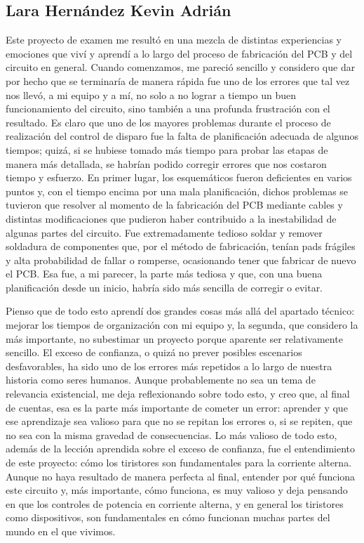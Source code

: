 \documentclass[12pt,a4paper]{article}
\begin{document}
\subsection*{Lara Hernández Kevin Adrián}
Este proyecto de examen me resultó en una mezcla de distintas experiencias y emociones que viví y aprendí a lo largo del proceso de fabricación del PCB y del circuito en general. Cuando comenzamos, me pareció sencillo y considero que dar por hecho que se terminaría de manera rápida fue uno de los errores que tal vez nos llevó, a mi equipo y a mí, no solo a no lograr a tiempo un buen funcionamiento del circuito, sino también a una profunda frustración con el resultado. Es claro que uno de los mayores problemas durante el proceso de realización del control de disparo fue la falta de planificación adecuada de algunos tiempos; quizá, si se hubiese tomado más tiempo para probar las etapas de manera más detallada, se habrían podido corregir errores que nos costaron tiempo y esfuerzo. En primer lugar, los esquemáticos fueron deficientes en varios puntos y, con el tiempo encima por una mala planificación, dichos problemas se tuvieron que resolver al momento de la fabricación del PCB mediante cables y distintas modificaciones que pudieron haber contribuido a la inestabilidad de algunas partes del circuito. Fue extremadamente tedioso soldar y remover soldadura de componentes que, por el método de fabricación, tenían pads frágiles y alta probabilidad de fallar o romperse, ocasionando tener que fabricar de nuevo el PCB. Esa fue, a mi parecer, la parte más tediosa y que, con una buena planificación desde un inicio, habría sido más sencilla de corregir o evitar.


Pienso que de todo esto aprendí dos grandes cosas más allá del apartado técnico: mejorar los tiempos de organización con mi equipo y, la segunda, que considero la más importante, no subestimar un proyecto porque aparente ser relativamente sencillo. El exceso de confianza, o quizá no prever posibles escenarios desfavorables, ha sido uno de los errores más repetidos a lo largo de nuestra historia como seres humanos. Aunque probablemente no sea un tema de relevancia existencial, me deja reflexionando sobre todo esto, y creo que, al final de cuentas, esa es la parte más importante de cometer un error: aprender y que ese aprendizaje sea valioso para que no se repitan los errores o, si se repiten, que no sea con la misma gravedad de consecuencias. Lo más valioso de todo esto, además de la lección aprendida sobre el exceso de confianza, fue el entendimiento de este proyecto: cómo los tiristores son fundamentales para la corriente alterna. Aunque no haya resultado de manera perfecta al final, entender por qué funciona este circuito y, más importante, cómo funciona, es muy valioso y deja pensando en que los controles de potencia en corriente alterna, y en general los tiristores como dispositivos, son fundamentales en cómo funcionan muchas partes del mundo en el que vivimos.
\newpage
\end{document}

